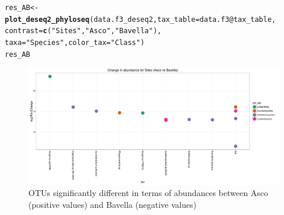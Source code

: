 \documentclass[12pt]{article}\usepackage[]{graphicx}\usepackage[]{color}
\makeatletter
\def\maxwidth{ %
  \ifdim\Gin@nat@width>\linewidth
    \linewidth
  \else
    \Gin@nat@width
  \fi
}
\newcommand{\hlstr}[1]{\textcolor[rgb]{0.192,0.494,0.8}{#1}}%
\newcommand{\hlopt}[1]{\textcolor[rgb]{0,0,0}{#1}}%
\newcommand{\hlstd}[1]{\textcolor[rgb]{0.345,0.345,0.345}{#1}}%
\newcommand{\hlkwb}[1]{\textcolor[rgb]{0.69,0.353,0.396}{#1}}%
\newcommand{\hlkwc}[1]{\textcolor[rgb]{0.333,0.667,0.333}{#1}}%
\newcommand{\hlkwd}[1]{\textcolor[rgb]{0.737,0.353,0.396}{\textbf{#1}}}%
\newenvironment{kframe}{%
 \def\at@end@of@kframe{}%
 \ifinner\ifhmode%
  \def\at@end@of@kframe{\end{minipage}}%
  \begin{minipage}{\columnwidth}%
 \fi\fi%
 \def\FrameCommand##1{\hskip\@totalleftmargin \hskip-\fboxsep
 \colorbox{shadecolor}{##1}\hskip-\fboxsep
     \hskip-\linewidth \hskip-\@totalleftmargin \hskip\columnwidth}%
 \MakeFramed {\advance\hsize-\width
   \@totalleftmargin\z@ \linewidth\hsize
   \@setminipage}}%
 {\par\unskip\endMakeFramed%
 \at@end@of@kframe}
\newenvironment{knitrout}{}{} %
\numberwithin{figure}{section}
\makeatother
\begin{document}
\begin{landscape}
\begin{knitrout}\small
{}\color{fgcolor}\begin{kframe}
\begin{alltt}
\hlstd{res_AB} \hlkwb{<-} \hlkwd{plot_deseq2_phyloseq}\hlstd{(data.f3_deseq2,} \hlkwc{tax_table} \hlstd{= data.f3}\hlopt{@}\hlkwc{tax_table}\hlstd{,}
                               \hlkwc{contrast} \hlstd{=} \hlkwd{c}\hlstd{(}\hlstr{"Sites"}\hlstd{,} \hlstr{"Asco"}\hlstd{,} \hlstr{"Bavella"}\hlstd{),}
                               \hlkwc{taxa} \hlstd{=} \hlstr{"Species"}\hlstd{,} \hlkwc{color_tax} \hlstd{=} \hlstr{"Class"}\hlstd{)}
\hlstd{res_AB}
\end{alltt}
\end{kframe}\begin{figure}

{\centering \includegraphics[width=\maxwidth]{figure/unnamed-chunk-71-1} 

}

\caption[OTUs significantly different in terms of abundances between Asco (positive values) and Bavella (negative values)]{OTUs significantly different in terms of abundances between Asco (positive values) and Bavella (negative values)}\label{fig:unnamed-chunk-71}
\end{figure}


\end{knitrout}
\end{landscape}
\end{document}
